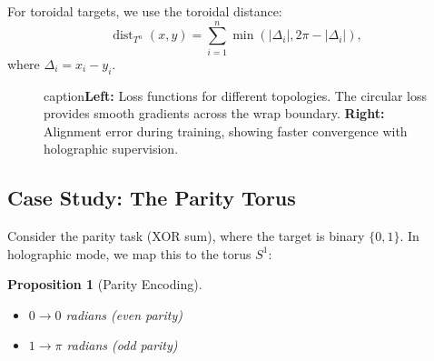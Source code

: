 \documentclass[12pt,letterpaper,twoside]{article}
\newtheorem{prop}{Proposition}[section]
\begin{document}
For toroidal targets, we use the toroidal distance:
\[
\operatorname{dist}_{T^n}(x, y) = \sum_{i=1}^n \min\left(|\Delta_i|, 2\pi - |\Delta_i|\right),
\]
where $\Delta_i = x_i - y_i$.

\begin{figure}[htbp]
\centering
{}
\hfill
{}
caption{\textbf{Left:} Loss functions for different topologies. The circular loss provides smooth gradients across the wrap boundary. \textbf{Right:} Alignment error during training, showing faster convergence with holographic supervision.}
\label{fig:alignment-loss}
\end{figure}

\subsection{Case Study: The Parity Torus}

Consider the parity task (XOR sum), where the target is binary $\{0, 1\}$. In holographic mode, we map this to the torus $S^1$:

\begin{prop}[Parity Encoding]
\begin{itemize}
\item $0 \to 0$ radians (even parity)
\item $1 \to \pi$ radians (odd parity)
\end{itemize}
\end{prop}
\end{document}
